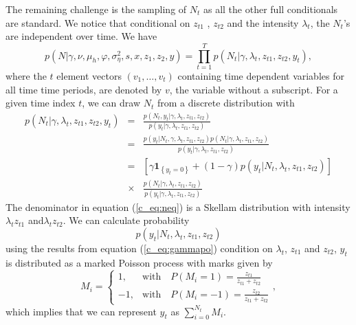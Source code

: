 \documentclass[12pt]{article}
\newcommand\mathbbm[1]{\mathbf{#1}}
\begin{document}
The remaining challenge is the sampling of $N_t$ as all the other
full conditionals are standard. We notice that conditional on $z_{t1}$ , $z_{t2}$
and the intensity $\lambda_t$, the $N_t$'s are independent over time. We have
\begin{equation}
p( N| \gamma, \nu,\mu_{h} ,\varphi,\sigma^{2}_{\eta},s,x ,z_{1} ,z_{2},y)=
\prod \limits_{t=1}^{T}p( N_t | \gamma, \lambda_t ,z_{t1} ,z_{t2}, y_t ) ,
\end{equation}
where  the $t$ element vectors $(v_1, \ldots, v_t)$ containing time
dependent variables for all time time periods, are denoted by $v$, the variable without a subscript.
For a given time index $t$, we can draw $N_t$ from a discrete distribution with  
 \begin{eqnarray}
p( N_t  | \gamma, \lambda_t ,z_{t1} ,z_{t2}, y_t ) &=& \frac{p( N_t, y_t  | \gamma, \lambda_t ,z_{t1} ,z_{t2})}{p(y_t | \gamma, \lambda_t ,z_{t1} ,z_{t2}) }  \nonumber \\
 &=& \frac{p( y_t | N_t, \gamma, \lambda_t ,z_{t1} ,z_{t2})p( N_t| \gamma, \lambda_t ,z_{t1} ,z_{t2}) }{p(y_t|  \gamma, \lambda_t ,z_{t1} ,z_{t2})} \nonumber \\
 &=& \left[ \gamma \mathbbm{1}_{\left\{y_t=0 \right\}} +(1-\gamma) p\left( y_t |N_t , \lambda_t ,z_{t1} ,z_{t2}\right) \right] \nonumber \\
 &\times &\frac{p( N_t| \gamma, \lambda_t ,z_{t1} ,z_{t2}) }{p(y_t|  \gamma, \lambda_t ,z_{t1} ,z_{t2})} 
 \label{c_eq:neq}
 \end{eqnarray}
 The denominator in equation (\ref{c_eq:neq}) is a Skellam  distribution  with intensity $\lambda_{t} z_{t1}$ and$\lambda_{t} z_{t2}$. We can calculate  probability 
\begin{equation}
 p\left( y_t |N_t , \lambda_t ,z_{t1} ,z_{t2}\right) 
\end{equation} 
using the results from equation (\ref{c_eq:gammapo})
condition on $\lambda_t$, $z_{t1}$ and $z_{t2}$, $y_t$ is distributed as a marked Poisson process with marks given by 
\begin{equation}
M_i =\begin{cases}
    1, & \text{with} \quad P(M_i = 1)= \frac{z_{t1} }{z_{t1}+z_{t2} } \\
    -1, & \text{with} \quad P(M_i = -1)= \frac{z_{t2} }{z_{t1}+z_{t2} } 
  \end{cases},
\end{equation}
which implies that we can represent $y_t$ as $\sum \limits_{i=0}^{N_t} M_i $.  
\end{document}
